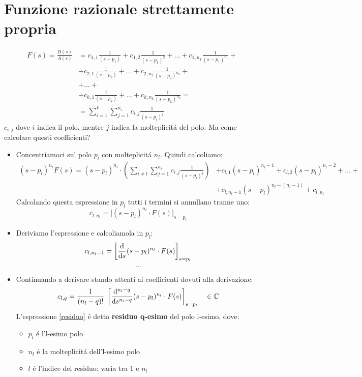 \documentclass[../main.tex]{subfiles}
\begin{document}
	\section{Funzione razionale strettamente propria}
		\begin{align*}
			F(s) = \frac{B(s)}{A(s)} &= c_{1,1} \frac{1}{(s-p_1)} + c_{1,2} \frac{1}{(s-p_1)^2} + \dots + c_{1,n_1} \frac{1}{(s-p_1)^{n_1}} +
			\\
			&+ c_{2,1} \frac{1}{(s-p_2)} + \dots + c_{2,n_2} \frac{1}{(s-p_2)^{n_2}} +
			\\
			&+ \dots +
			\\
			&+ c_{k,1} \frac{1}{(s-p_k)} + \dots + c_{k,n_k} \frac{1}{(s-p_k)^{n_k}} =
			\\
			&= \sum_{i=1}^{k} \sum_{j=1}^{n_i} c_{i,j} \frac{1}{(s-p_i)^j}
		\end{align*}
		$ c_{i,j} $ dove $ i $ indica il polo, mentre $ j $ indica la molteplicit\'{a} del polo. Ma come calcolare questi coefficienti?
		\begin{itemize}
			\item 
				Concentriamoci sul polo $ p_l $ con molteplicit\'{a} $ n_l $. Quindi calcoliamo:
				\begin{align*}
					(s-p_l)^{n_l} F(s) = (s-p_l)^{n_l} \cdot \left( \sum_{i \neq l} \sum_{j=1}^{n_i} c_{i,j} \frac{1}{(s-p_i)^j} \right) &+ c_{l,1} (s-p_l)^{n_l -1} + c_{l,2} (s-p_l)^{n_l -2} + \dots +
					\\
					&+ c_{l,n_l -1} (s-p_l)^{n_l - (n_l -1)} + c_{l,n_l}
				\end{align*}
				Calcolando questa espressione in $p_l$ tutti i termini si annullano tranne uno:
				\[
					c_{l,n_l} = \big[ (s-p_l)^{n_l} \cdot F(s) \big]_{s=p_l}
				\]
			\item
				Deriviamo l'espressione e calcoliamola in $p_l$:
				\[
					c_{l,n_l-1} = \left[ \frac{\mathrm{d} }{\mathrm{d} s} (s-p_l)^{n_l} \cdot F(s) \right]_{s=p_l}
				\]
				\[
					\dots
				\]
			\item
				Continuando a derivare stando attenti ai coefficienti dovuti alla derivazione:
				\begin{equation}
				\label{residuo}
					c_{l,q} = \frac{1}{(n_l - q)!}\: \left[ \frac{\mathrm{d} {}^{n_l - q}}{\mathrm{d} s^{n_l - q}} (s-p_l)^{n_l} \cdot F(s) \right]_{s=p_l} \quad \in \mathbb{C}
				\end{equation}
				L'espressione \ref{residuo} \'{e} detta \textbf{residuo q-esimo} del polo l-esimo, dove:
				\begin{itemize}
					\item $ p_l $ \'{e} l'l-esimo polo
					\item $ n_l $ \'{e} la molteplicit\'{a} dell'l-esimo polo
					\item $ l $ \'{e} l'indice del residuo: varia tra $ 1 $ e $ n_l $
				\end{itemize}
		\end{itemize}
	
\end{document}
